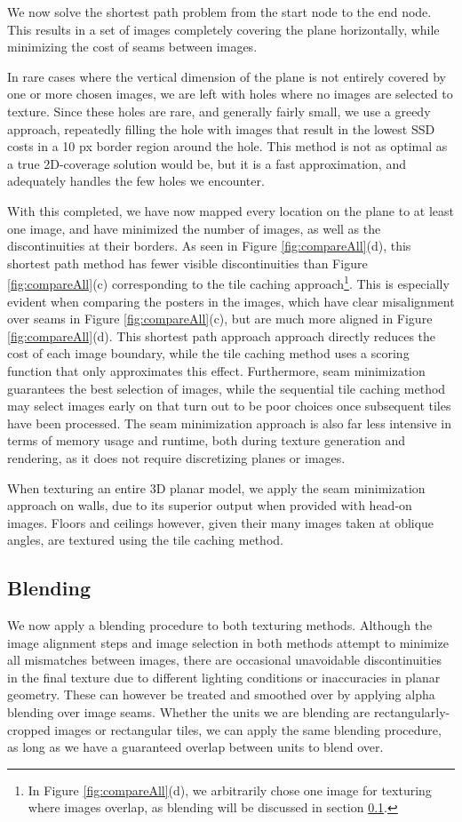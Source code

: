 \documentclass[]{spie}  %
\begin{document}
We now solve the shortest path problem from the start node to the end
node. This results in a set of images completely covering the plane
horizontally, while minimizing the cost of seams between images.

In rare cases where the vertical dimension of the plane is not
entirely covered by one or more chosen images, we are left with holes
where no images are selected to texture. Since these holes are rare,
and generally fairly small, we use a greedy approach, repeatedly
filling the hole with images that result in the lowest SSD costs in a
10 px border region around the hole. This method is not as optimal as
a true 2D-coverage solution would be, but it is a fast approximation,
and adequately handles the few holes we encounter.

With this completed, we have now mapped every location on the plane to
at least one image, and have minimized the number of images, as well
as the discontinuities at their borders. As seen in Figure
\ref{fig:compareAll}(d), this shortest path method has fewer visible
discontinuities than Figure \ref{fig:compareAll}(c) corresponding to
the tile caching approach\footnote{In Figure \ref{fig:compareAll}(d),
  we arbitrarily chose one image for texturing where images overlap,
  as blending will be discussed in section \ref{sec:blending}.}. This
is especially evident when comparing the posters in the images, which
have clear misalignment over seams in Figure \ref{fig:compareAll}(c),
but are much more aligned in Figure \ref{fig:compareAll}(d). This
shortest path approach approach directly reduces the cost of each
image boundary, while the tile caching method uses a scoring function
that only approximates this effect. Furthermore, seam minimization
guarantees the best selection of images, while the sequential tile
caching method may select images early on that turn out to be poor
choices once subsequent tiles have been processed. The seam
minimization approach is also far less intensive in terms of memory
usage and runtime, both during texture generation and rendering, as it
does not require discretizing planes or images.

When texturing an entire 3D planar model, we apply the seam
minimization approach on walls, due to its superior output when
provided with head-on images. Floors and ceilings however, given their
many images taken at oblique angles, are textured using the tile
caching method.


\subsection{Blending}
\label{sec:blending}
We now apply a blending procedure to both texturing methods. Although
the image alignment steps and image selection in both methods attempt
to minimize all mismatches between images, there are occasional
unavoidable discontinuities in the final texture due to different
lighting conditions or inaccuracies in planar geometry. These can
however be treated and smoothed over by applying alpha blending over
image seams.  Whether the units we are blending are
rectangularly-cropped images or rectangular tiles, we can apply the
same blending procedure, as long as we have a guaranteed overlap
between units to blend over.
\end{document}
